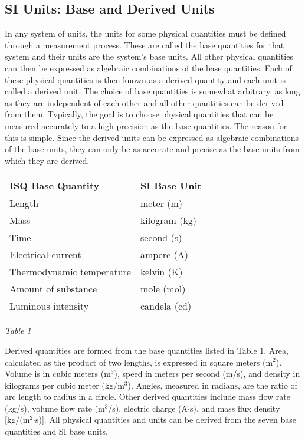\documentclass{report}
\begin{document}
    \subsection{SI Units: Base and Derived Units}
    \bigbreak \noindent 
    In any system of units, the units for some physical quantities must be defined through a measurement process. These are called the base quantities for that system and their units are the system’s base units. All other physical quantities can then be expressed as algebraic combinations of the base quantities. Each of these physical quantities is then known as a derived quantity and each unit is called a derived unit. The choice of base quantities is somewhat arbitrary, as long as they are independent of each other and all other quantities can be derived from them. Typically, the goal is to choose physical quantities that can be measured accurately to a high precision as the base quantities. The reason for this is simple. Since the derived units can be expressed as algebraic combinations of the base units, they can only be as accurate and precise as the base units from which they are derived.
    \bigbreak \noindent 
    \begin{tabularx}{\textwidth}{|X|X|}
        \hline
        ISQ Base Quantity & SI Base Unit \\
        \hline
        Length & meter (m) \\
        \hline
        Mass & kilogram (kg) \\
        \hline
        Time & second (s) \\
        \hline
        Electrical current & ampere (A) \\
        \hline
        Thermodynamic temperature & kelvin (K) \\
        \hline
        Amount of substance & mole (mol) \\
        \hline
        Luminous intensity & candela (cd) \\
        \hline
    \end{tabularx}
    \bigbreak \noindent 
    \begin{center}
        \textit{Table 1}
    \end{center}
    \bigbreak \noindent 
    Derived quantities are formed from the base quantities listed in Table 1. Area, calculated as the product of two lengths, is expressed in square meters (m$^2$). Volume is in cubic meters (m$^3$), speed in meters per second (m/s), and density in kilograms per cubic meter (kg/m$^3$). Angles, measured in radians, are the ratio of arc length to radius in a circle. Other derived quantities include mass flow rate (kg/s), volume flow rate (m$^3$/s), electric charge (A$\cdot$s), and mass flux density [kg/(m$^2$$\cdot$s)]. All physical quantities and units can be derived from the seven base quantities and SI base units.
\end{document}
